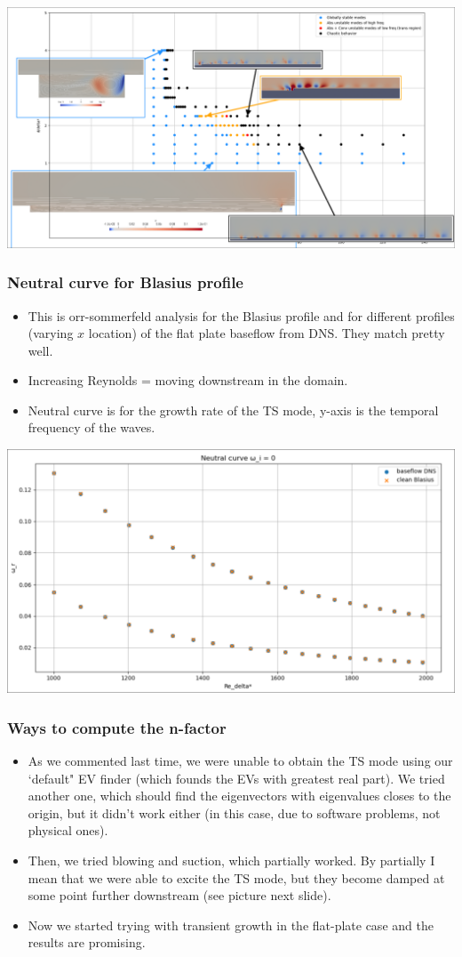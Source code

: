 \documentclass[
  aspectratio=169, %
  t, %
  onlytextwidth, %
  10pt, %
]{beamer}
\begin{document}
\begin{frame}
	\centering
	\includegraphics[width=0.98\linewidth]{Images/stabiliycurve_withImages.png}
\end{frame}
\begin{frame}
	\frametitle{Neutral curve for Blasius profile}
	\begin{itemize}
		\item This is orr-sommerfeld analysis for the Blasius profile and for different profiles (varying $x$ location) of the flat plate baseflow from DNS. They match pretty well.
		\item Increasing Reynolds = moving downstream in the domain.
		\item Neutral curve is for the growth rate of the TS mode, y-axis is the temporal frequency of the waves.
	\end{itemize}
	\centering
	\includegraphics[width=0.7\linewidth]{Images/neutralcurve.png}
\end{frame}
\begin{frame}
	\frametitle{Ways to compute the n-factor}
	\begin{itemize}
		\item As we commented last time, we were unable to obtain the TS mode using our `default" EV finder (which founds the EVs with greatest real part). We tried another one, which should find the eigenvectors with eigenvalues closes to the origin, but it didn't work either (in this case, due to software problems, not physical ones).
		\item Then, we tried blowing and suction, which partially worked. By partially I mean that we were able to excite the TS mode, but they become damped at some point further downstream (see picture next slide).
		\item Now we started trying with transient growth in the flat-plate case and the results are promising.
	\end{itemize}

\end{frame}
\end{document}
